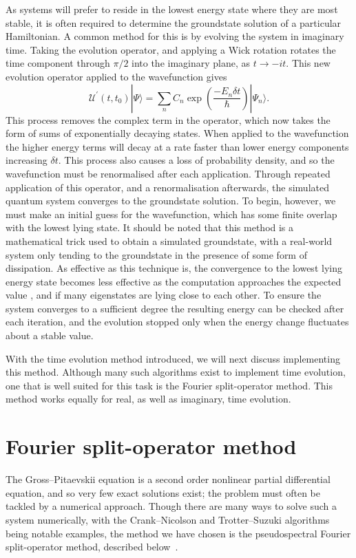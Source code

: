 As systems will prefer to reside in the lowest energy state where they are most stable, it is often required to determine the groundstate solution of a particular Hamiltonian. A common method for this is by evolving the system in imaginary time. Taking the evolution operator, and applying a Wick rotation \cite{NUM:Bader_jcp_2013} rotates the time component through $\pi/2$ into the imaginary plane, as $t \rightarrow -it$. This new evolution operator applied to the wavefunction gives
\begin{equation}
       \mathscr{U^{'}}(t,t_0)|\Psi \rangle = \displaystyle\sum\limits_{n} C_n \exp\left(\frac{-{E_n}\delta t}{\hbar}\right)|\Psi_n \rangle.
\end{equation}
This process removes the complex term in the operator, which now takes the form of sums of exponentially decaying states. When applied to the wavefunction the higher energy terms will decay at a rate faster than lower energy components increasing $\delta t$. This process also causes a loss of probability density, and so the wavefunction must be renormalised after each application. Through repeated application of this operator, and a renormalisation afterwards, the simulated quantum system converges to the groundstate solution. To begin, however, we must make an initial guess for the wavefunction, which has some finite overlap with the lowest lying state. It should be noted that this method is a mathematical trick used to obtain a simulated groundstate, with a real-world system only tending to the groundstate in the presence of some form of dissipation. As effective as this technique is, the convergence to the lowest lying energy state becomes less effective as the computation approaches the expected value \cite{Vtx:Danaila_pra_2005}, and if many eigenstates are lying close to each other. To ensure the system converges to a sufficient degree the resulting energy can be checked after each iteration, and the evolution stopped only when the energy change fluctuates about a stable value.

With the time evolution method introduced, we will next discuss implementing this method. Although many such algorithms exist to implement time evolution, one that is well suited for this task is the Fourier split-operator method. This method works equally for real, as well as imaginary, time evolution.

\section{Fourier split-operator method}\label{sec:fso}
The Gross--Pitaevskii equation is a second order nonlinear partial differential equation, and so very few exact solutions exist; the problem must often be tackled by a numerical approach. Though there are many ways to solve such a system numerically, with the Crank--Nicolson and Trotter--Suzuki algorithms being notable examples, the method we have chosen is the pseudospectral Fourier split-operator method, described below~\cite{Num:Bauke_cpc_2011}.

